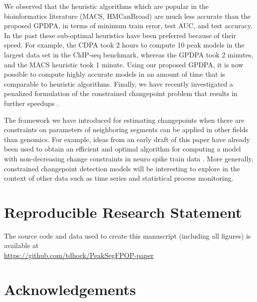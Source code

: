 \documentclass[twoside,11pt]{article}
\begin{document}
We observed that the heuristic algorithms which are popular in the
bioinformatics literature (MACS, HMCanBroad) are much less accurate
than the proposed GPDPA, in terms of minimum train error, test AUC, and
test accuracy. In the past these sub-optimal heuristics have been
preferred because of their speed. For example, the CDPA took 2 hours
to compute 10 peak models in the largest data set in the ChIP-seq
benchmark, whereas the GPDPA took 2 minutes, and the MACS heuristic
took 1 minute. Using our proposed GPDPA, it is now possible to compute
highly accurate models in an amount of time that is comparable to
heuristic algorithms. 
Finally, we have recently investigated a penalized formulation of the constrained changepoint problem that results in further speedups \citep{HOCKING-GFPOP}.

The framework we have introduced for estimating changepoints when
there are constraints on parameters of neighboring segments can be
applied in other fields than genomics. For example, ideas from an
early draft of this paper
\citep{Hocking-constrained-changepoint-detection} have already been
used to obtain an efficient and optimal algorithm for computing a model with non-decreasing change constraints in
neuro spike train data \citep{Jewell2018}. More generally, constrained
changepoint detection models will be interesting to explore in the
context of other data such as time series and statistical process
monitoring.
 
\section{Reproducible Research Statement}

The source code and data used to create this manuscript (including all
figures) is available at\\
\url{https://github.com/tdhock/PeakSegFPOP-paper}


\section{Acknowledgements}
  
\end{document}
